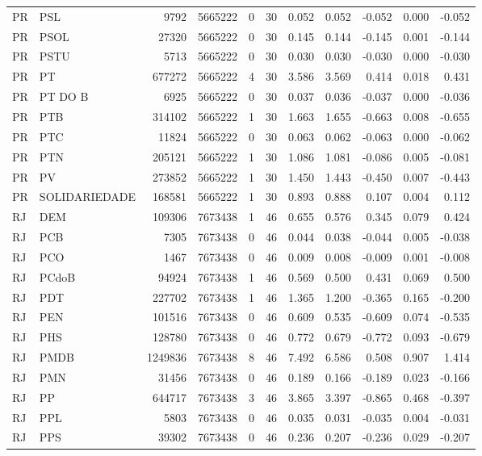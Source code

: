 \begin{landscape}
\begin{longtable}{llrrrrrrrrr}
PR & PSL & 9792 & 5665222 & 0 & 30 & 0.052 & 0.052 & -0.052 & 0.000 & -0.052 \\
PR & PSOL & 27320 & 5665222 & 0 & 30 & 0.145 & 0.144 & -0.145 & 0.001 & -0.144 \\
PR & PSTU & 5713 & 5665222 & 0 & 30 & 0.030 & 0.030 & -0.030 & 0.000 & -0.030 \\
PR & PT & 677272 & 5665222 & 4 & 30 & 3.586 & 3.569 & 0.414 & 0.018 & 0.431 \\
PR & PT DO B & 6925 & 5665222 & 0 & 30 & 0.037 & 0.036 & -0.037 & 0.000 & -0.036 \\
PR & PTB & 314102 & 5665222 & 1 & 30 & 1.663 & 1.655 & -0.663 & 0.008 & -0.655 \\
PR & PTC & 11824 & 5665222 & 0 & 30 & 0.063 & 0.062 & -0.063 & 0.000 & -0.062 \\
PR & PTN & 205121 & 5665222 & 1 & 30 & 1.086 & 1.081 & -0.086 & 0.005 & -0.081 \\
PR & PV & 273852 & 5665222 & 1 & 30 & 1.450 & 1.443 & -0.450 & 0.007 & -0.443 \\
PR & SOLIDARIEDADE & 168581 & 5665222 & 1 & 30 & 0.893 & 0.888 & 0.107 & 0.004 & 0.112 \\
RJ & DEM & 109306 & 7673438 & 1 & 46 & 0.655 & 0.576 & 0.345 & 0.079 & 0.424 \\
RJ & PCB & 7305 & 7673438 & 0 & 46 & 0.044 & 0.038 & -0.044 & 0.005 & -0.038 \\
RJ & PCO & 1467 & 7673438 & 0 & 46 & 0.009 & 0.008 & -0.009 & 0.001 & -0.008 \\
RJ & PCdoB & 94924 & 7673438 & 1 & 46 & 0.569 & 0.500 & 0.431 & 0.069 & 0.500 \\
RJ & PDT & 227702 & 7673438 & 1 & 46 & 1.365 & 1.200 & -0.365 & 0.165 & -0.200 \\
RJ & PEN & 101516 & 7673438 & 0 & 46 & 0.609 & 0.535 & -0.609 & 0.074 & -0.535 \\
RJ & PHS & 128780 & 7673438 & 0 & 46 & 0.772 & 0.679 & -0.772 & 0.093 & -0.679 \\
RJ & PMDB & 1249836 & 7673438 & 8 & 46 & 7.492 & 6.586 & 0.508 & 0.907 & 1.414 \\
RJ & PMN & 31456 & 7673438 & 0 & 46 & 0.189 & 0.166 & -0.189 & 0.023 & -0.166 \\
RJ & PP & 644717 & 7673438 & 3 & 46 & 3.865 & 3.397 & -0.865 & 0.468 & -0.397 \\
RJ & PPL & 5803 & 7673438 & 0 & 46 & 0.035 & 0.031 & -0.035 & 0.004 & -0.031 \\
RJ & PPS & 39302 & 7673438 & 0 & 46 & 0.236 & 0.207 & -0.236 & 0.029 & -0.207 \\

\end{longtable}
\end{landscape}
